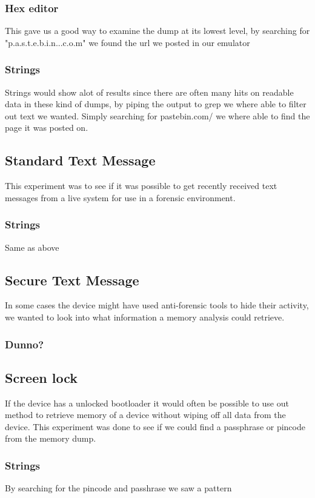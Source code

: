 \subsubsection{Hex editor}
This gave us a good way to examine the dump at its lowest level, by searching for 
"p.a.s.t.e.b.i.n...c.o.m" we found the url we posted in our emulator

\subsubsection{Strings}
Strings would show alot of results since there are often many hits on readable 
data in these kind of dumps, by piping the output to grep we where able to 
filter out text we wanted. Simply searching for pastebin.com/ we where able to 
find the page it was posted on. 

\subsection{Standard Text Message}
This experiment was to see if it was possible to get recently received text 
messages from a live system for use in a forensic environment.

\subsubsection{Strings}
Same as above %

\subsection{Secure Text Message}
In some cases the device might have used anti-forensic tools to hide their 
activity, we wanted to look into what information a memory analysis could 
retrieve.

\subsubsection{Dunno?}

\subsection{Screen lock}
If the device has a unlocked bootloader it would often be possible to use out 
method to retrieve memory of a device without wiping off all data from the 
device. This experiment was done to see if we could find a passphrase or 
pincode from the memory dump.

\subsubsection{Strings}
By searching for the pincode and passhrase we saw a pattern 

